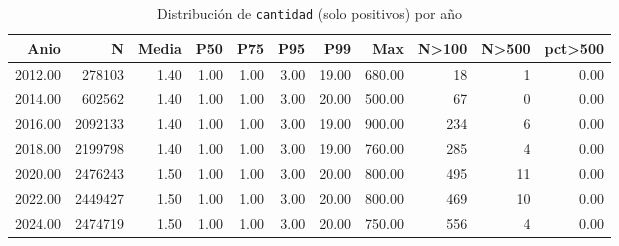 \begin{table}[ht]
\centering
\caption{Distribuci\'on de \texttt{cantidad} (solo positivos) por a\~{n}o} 
\label{tab:02_distribucion_cantidad}
\begin{tabular}{rrrrrrrrrrr}
  \toprule
Anio & N & Media & P50 & P75 & P95 & P99 & Max & N>100 & N>500 & pct>500 \\ 
  \midrule
2012.00 & 278103 & 1.40 & 1.00 & 1.00 & 3.00 & 19.00 & 680.00 &  18 &   1 & 0.00 \\ 
  2014.00 & 602562 & 1.40 & 1.00 & 1.00 & 3.00 & 20.00 & 500.00 &  67 &   0 & 0.00 \\ 
  2016.00 & 2092133 & 1.40 & 1.00 & 1.00 & 3.00 & 19.00 & 900.00 & 234 &   6 & 0.00 \\ 
  2018.00 & 2199798 & 1.40 & 1.00 & 1.00 & 3.00 & 19.00 & 760.00 & 285 &   4 & 0.00 \\ 
  2020.00 & 2476243 & 1.50 & 1.00 & 1.00 & 3.00 & 20.00 & 800.00 & 495 &  11 & 0.00 \\ 
  2022.00 & 2449427 & 1.50 & 1.00 & 1.00 & 3.00 & 20.00 & 800.00 & 469 &  10 & 0.00 \\ 
  2024.00 & 2474719 & 1.50 & 1.00 & 1.00 & 3.00 & 20.00 & 750.00 & 556 &   4 & 0.00 \\ 
   \bottomrule
\end{tabular}
\end{table}
